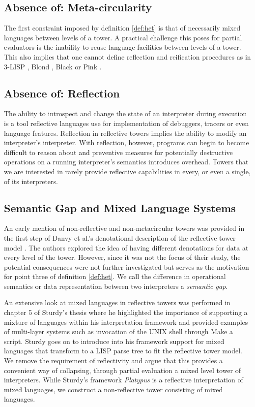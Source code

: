 \documentclass[a4paper,12pt,twoside,openright]{report}
\theoremstyle{definition}
\begin{document}
\subsection{Absence of: Meta-circularity}
The first constraint imposed by definition \ref{def:het} is that of necessarily mixed languages between levels of a tower. A practical challenge this poses for partial evaluators is the inability to reuse language facilities between levels of a tower. This also implies that one cannot define reflection and reification procedures as in 3-LISP \cite{smith1984reflection}, Blond \cite{danvy1988intensions}, Black \cite{asai1996duplication} or Pink \cite{amin2017collapsing}.

\subsection{Absence of: Reflection}
The ability to introspect and change the state of an interpreter during execution is a tool reflective languages use for implementation of debuggers, tracers or even language features. Reflection in reflective towers implies the ability to modify an interpreter's interpreter. With reflection, however, programs can begin to become difficult to reason about and preventive measures for potentially destructive operations on a running interpreter's semantics introduces overhead. Towers that we are interested in rarely provide reflective capabilities in every, or even a single, of its interpreters.

\subsection{Semantic Gap and Mixed Language Systems}
An early mention of non-reflective and non-metacircular towers was provided in the first step of Danvy et al.'s denotational description of the reflective tower model \cite{danvy1988intensions}. The authors explored the idea of having different denotations for data at every level of the tower. However, since it was not the focus of their study, the potential consequences were not further investigated but serves as the motivation for point three of definition \ref{def:het}. We call the difference in operational semantics or data representation between two interpreters a \textit{semantic gap}.

An extensive look at mixed languages in reflective towers was performed in chapter 5 of Sturdy's thesis \cite{sturdy1993lisp} where he highlighted the importance of supporting a mixture of languages within his interpretation framework and provided examples of multi-layer systems such as invocation of the UNIX shell through Make a script. Sturdy goes on to introduce into his framework support for mixed languages that transform to a LISP parse tree to fit the reflective tower model. We remove the requirement of reflectivity and argue that this provides a convenient way of collapsing, through partial evaluation a mixed level tower of interpreters. While Sturdy's framework \textit{Platypus} is a reflective interpretation of mixed languages, we construct a non-reflective tower consisting of mixed languages.
\end{document}
